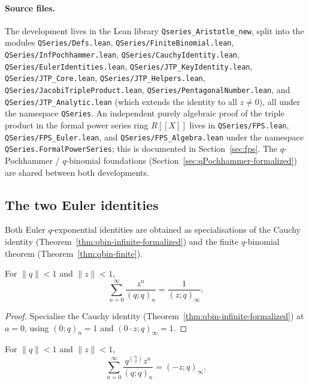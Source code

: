 \paragraph{Source files.} The development lives in the Lean library
\texttt{Qseries\_Aristotle\_new}, split into the modules
\texttt{QSeries/Defs.lean}, \texttt{QSeries/FiniteBinomial.lean},
\texttt{QSeries/InfPochhammer.lean}, \texttt{QSeries/CauchyIdentity.lean},
\texttt{QSeries/EulerIdentities.lean}, \texttt{QSeries/JTP\_KeyIdentity.lean},
\texttt{QSeries/JTP\_Core.lean}, \texttt{QSeries/JTP\_Helpers.lean},
\texttt{QSeries/JacobiTripleProduct.lean},
\texttt{QSeries/PentagonalNumber.lean}, and
\texttt{QSeries/JTP\_Analytic.lean} (which extends the identity to all
$z \neq 0$), all under the namespace \texttt{QSeries}. An independent
purely algebraic proof of the triple product in the formal power series ring
$R[\![ X]\!]$ lives in \texttt{QSeries/FPS.lean},
\texttt{QSeries/FPS\_Euler.lean}, and \texttt{QSeries/FPS\_Algebra.lean}
under the namespace \texttt{QSeries.FormalPowerSeries}; this is documented in
Section~\ref{sec:fps}. The $q$-Pochhammer / $q$-binomial foundations
(Section~\ref{sec:qPochhammer-formalized}) are shared between both
developments.

\subsection{The two Euler identities}

Both Euler $q$-exponential identities are obtained as specialisations of the
Cauchy identity (Theorem~\ref{thm:qbin-infinite-formalized}) and the finite
$q$-binomial theorem (Theorem~\ref{thm:qbin-finite}).

\begin{lemma}\label{lem:euler-first}\leanok{}
For $\|q\| < 1$ and $\|z\| < 1$,
\[
  \sum_{n=0}^{\infty} \frac{z^n}{(q;q)_n} = \frac{1}{(z;q)_\infty}.
\]
\end{lemma}

\begin{proof}\leanok
Specialise the Cauchy identity
(Theorem~\ref{thm:qbin-infinite-formalized}) at $a = 0$, using
$(0;q)_n = 1$ and $(0\cdot z;q)_\infty = 1$.
\end{proof}

\begin{lemma}\label{lem:euler-second}\leanok{}
For $\|q\| < 1$ and $\|z\| < 1$,
\[
  \sum_{n=0}^{\infty} \frac{q^{\binom{n}{2}} z^n}{(q;q)_n} = (-z;q)_\infty.
\]
\end{lemma}

